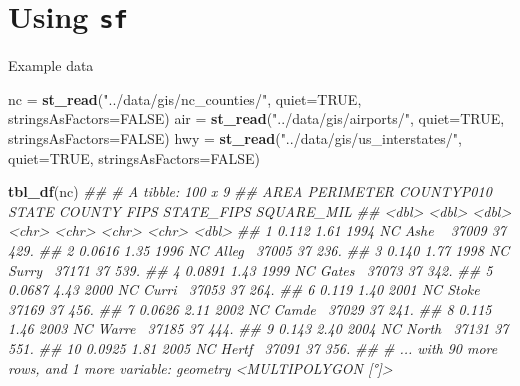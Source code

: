\documentclass[11pt,ignorenonframetext,]{beamer}
\newenvironment{Shaded}{}{}
\newcommand{\CommentTok}[1]{\textcolor[rgb]{0.38,0.63,0.69}{\textit{#1}}}
\newcommand{\DataTypeTok}[1]{\textcolor[rgb]{0.56,0.13,0.00}{#1}}
\newcommand{\KeywordTok}[1]{\textcolor[rgb]{0.00,0.44,0.13}{\textbf{#1}}}
\newcommand{\NormalTok}[1]{#1}
\newcommand{\OtherTok}[1]{\textcolor[rgb]{0.00,0.44,0.13}{#1}}
\newcommand{\StringTok}[1]{\textcolor[rgb]{0.25,0.44,0.63}{#1}}
\let\oldShaded\Shaded
\let\endoldShaded\endShaded
\renewenvironment{Shaded}{\footnotesize\begin{spacing}{0.9}\oldShaded}{\endoldShaded\end{spacing}}
\let\oldverbatim\verbatim
\let\endoldverbatim\endverbatim
\newcommand{\scriptoutput}{
  \renewenvironment{Shaded}{\scriptsize\begin{spacing}{0.9}\oldShaded}{\endoldShaded\end{spacing}}
  \renewenvironment{verbatim}{\scriptsize\begin{spacing}{0.9}\oldverbatim}{\endoldverbatim\end{spacing}}
}
\begin{document}
\hypertarget{using-sf}{%
\section{\texorpdfstring{Using \texttt{sf}}{Using sf}}\label{using-sf}}

\begin{frame}[fragile,t]{Example data}
\protect\hypertarget{example-data}{}

\scriptoutput

\begin{Shaded}
\begin{Highlighting}[]
\NormalTok{nc  =}\StringTok{ }\KeywordTok{st_read}\NormalTok{(}\StringTok{"../data/gis/nc_counties/"}\NormalTok{, }\DataTypeTok{quiet=}\OtherTok{TRUE}\NormalTok{, }\DataTypeTok{stringsAsFactors=}\OtherTok{FALSE}\NormalTok{)}
\NormalTok{air =}\StringTok{ }\KeywordTok{st_read}\NormalTok{(}\StringTok{"../data/gis/airports/"}\NormalTok{, }\DataTypeTok{quiet=}\OtherTok{TRUE}\NormalTok{, }\DataTypeTok{stringsAsFactors=}\OtherTok{FALSE}\NormalTok{)}
\NormalTok{hwy =}\StringTok{ }\KeywordTok{st_read}\NormalTok{(}\StringTok{"../data/gis/us_interstates/"}\NormalTok{, }\DataTypeTok{quiet=}\OtherTok{TRUE}\NormalTok{, }\DataTypeTok{stringsAsFactors=}\OtherTok{FALSE}\NormalTok{)}

\KeywordTok{tbl_df}\NormalTok{(nc)}
\CommentTok{## # A tibble: 100 x 9}
\CommentTok{##      AREA PERIMETER COUNTYP010 STATE COUNTY FIPS  STATE_FIPS SQUARE_MIL}
\CommentTok{##     <dbl>     <dbl>      <dbl> <chr> <chr>  <chr> <chr>           <dbl>}
\CommentTok{##  1 0.112       1.61       1994 NC    Ashe ~ 37009 37               429.}
\CommentTok{##  2 0.0616      1.35       1996 NC    Alleg~ 37005 37               236.}
\CommentTok{##  3 0.140       1.77       1998 NC    Surry~ 37171 37               539.}
\CommentTok{##  4 0.0891      1.43       1999 NC    Gates~ 37073 37               342.}
\CommentTok{##  5 0.0687      4.43       2000 NC    Curri~ 37053 37               264.}
\CommentTok{##  6 0.119       1.40       2001 NC    Stoke~ 37169 37               456.}
\CommentTok{##  7 0.0626      2.11       2002 NC    Camde~ 37029 37               241.}
\CommentTok{##  8 0.115       1.46       2003 NC    Warre~ 37185 37               444.}
\CommentTok{##  9 0.143       2.40       2004 NC    North~ 37131 37               551.}
\CommentTok{## 10 0.0925      1.81       2005 NC    Hertf~ 37091 37               356.}
\CommentTok{## # ... with 90 more rows, and 1 more variable: geometry <MULTIPOLYGON [°]>}
\end{Highlighting}
\end{Shaded}

\end{frame}
\end{document}
